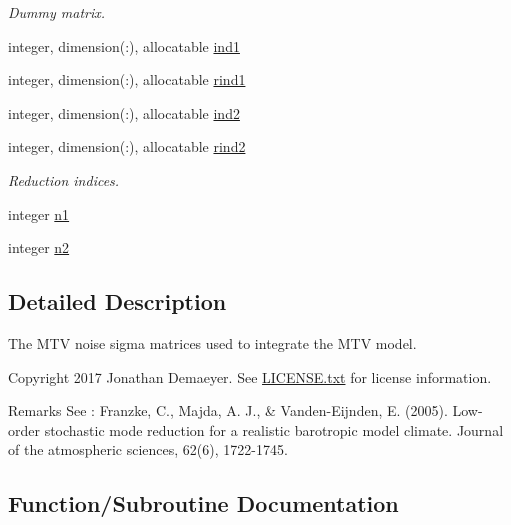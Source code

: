 \begin{DoxyCompactItemize}
\begin{DoxyCompactList}\small\item\em Dummy matrix. \end{DoxyCompactList}\item 
integer, dimension(\+:), allocatable \hyperlink{namespacesigma_a3f8dbbf3b119812ecc38f3e2cb0dcdf2}{ind1}
\item 
integer, dimension(\+:), allocatable \hyperlink{namespacesigma_ae2753201d5fd5cf3ab0d5b103b9eb27a}{rind1}
\item 
integer, dimension(\+:), allocatable \hyperlink{namespacesigma_a5f8dd1d30a05aa1b77988cf43e9664bb}{ind2}
\item 
integer, dimension(\+:), allocatable \hyperlink{namespacesigma_afd4965b46adc2446101f6f3bf072e28f}{rind2}
\begin{DoxyCompactList}\small\item\em Reduction indices. \end{DoxyCompactList}\item 
integer \hyperlink{namespacesigma_a99bf91cd11d1a6d59216fceee65b9b4b}{n1}
\item 
integer \hyperlink{namespacesigma_a4019bcd3294851992406e2f6a284413b}{n2}
\end{DoxyCompactItemize}


\subsection{Detailed Description}
The M\+TV noise sigma matrices used to integrate the M\+TV model. 

\begin{DoxyCopyright}{Copyright}
2017 Jonathan Demaeyer. See \hyperlink{LICENSE_8txt}{L\+I\+C\+E\+N\+S\+E.\+txt} for license information. 
\end{DoxyCopyright}
\begin{DoxyRemark}{Remarks}
See \+: Franzke, C., Majda, A. J., \& Vanden-\/\+Eijnden, E. (2005). Low-\/order stochastic mode reduction for a realistic barotropic model climate. Journal of the atmospheric sciences, 62(6), 1722-\/1745. 
\end{DoxyRemark}


\subsection{Function/\+Subroutine Documentation}
